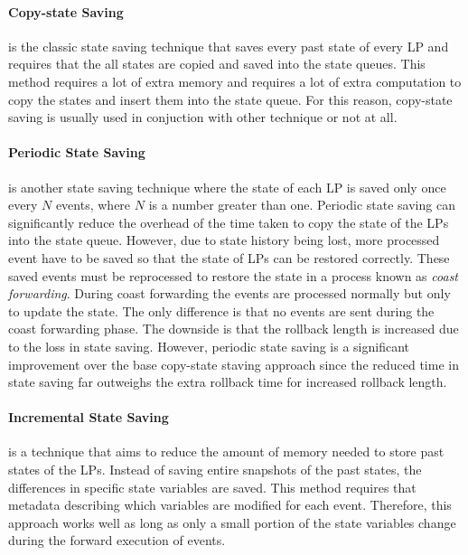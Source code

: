 \documentclass[11pt]{book}
\begin{document}
\paragraph{Copy-state Saving} is the classic state saving technique that saves every past
state of every LP and requires that the all states are copied and saved into the state queues.
This method requires a lot of extra memory and requires a lot of extra computation to copy
the states and insert them into the state queue. For this reason, copy-state saving is
usually used in conjuction with other technique or not at all.

\paragraph{Periodic State Saving} is another state saving technique where the state of each LP
is saved only once every $N$ events, where $N$ is a number greater than one. Periodic state
saving can significantly reduce the overhead of the time taken to copy the state of the
LPs into the state queue. However, due to state history being lost, more processed event
have to be saved so that the state of LPs can be restored correctly. These saved events
must be reprocessed to restore the state in a process known as \emph{coast forwarding}.
During coast forwarding the events are processed normally but only to update the state.
The only difference is that no events are sent during the coast forwarding phase. The
downside is that the rollback length is increased due to the loss in state saving. However,
periodic state saving is a significant improvement over the base copy-state staving approach
since the reduced time in state saving far outweighs the extra rollback time for increased
rollback length.

\paragraph{Incremental State Saving} is a technique that aims to reduce the amount of
memory needed to store past states of the LPs. Instead of saving entire snapshots of the
past states, the differences in specific state variables are saved. This method requires
that metadata describing which variables are modified for each event. Therefore, this approach
works well as long as only a small portion of the state variables change during the forward
execution of events.
\end{document}
